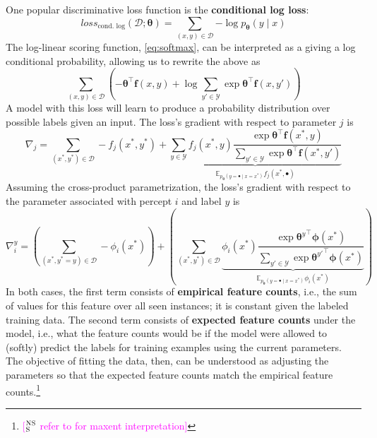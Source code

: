 \documentclass[11pt,letterpaper]{article}
\newcommand{\ensuretext}[1]{#1}
\newcommand{\nssmarker}{\ensuretext{\textcolor{magenta}{\ensuremath{^{\textsc{NS}}_{\textsc{S}}}}}}
\newcommand{\arkcomment}[3]{\ensuretext{\textcolor{#3}{[#1 #2]}}}
\newcommand{\nss}[1]{\arkcomment{\nssmarker}{#1}{magenta}}
\begin{document}
One popular discriminative loss function is the \textbf{conditional log loss}:
\begin{equation}\label{eq:logloss}
\textit{loss}_\text{cond. log}(\mathcal{D}; \boldsymbol{\theta}) = \sum_{(x,y)\in\mathcal{D}}{-\log{p_{\boldsymbol{\theta}}(y \mid x)}}
\end{equation}
The log-linear scoring function, \cref{eq:softmax}, can be interpreted as a giving a log conditional probability, 
allowing us to rewrite the above as 
\begin{equation}
\sum_{(x,y)\in\mathcal{D}}{\left(-\boldsymbol{\theta}^\top\mathbf{f}(x,y)+\log{\sum_{y'\in\mathcal{Y}}{\exp{\boldsymbol{\theta}^\top\mathbf{f}(x,y')}}}\right)}
\end{equation}
A model with this loss will learn to produce a probability distribution over possible labels given an input.
The loss's gradient with respect to parameter $j$ is
\begin{equation}\label{eq:loggrad}
\nabla_j = \sum_{(x^*,y^*)\in\mathcal{D}}-f_j(x^*,y^*)+\underbrace{\sum_{y\in\mathcal{Y}} f_j(x^*,y)\frac{\exp{\boldsymbol{\theta}^{\top}\mathbf{f}(x^*,y)}}{\sum_{y'\in\mathcal{Y}}{\exp{\boldsymbol{\theta}^{\top}\mathbf{f}(x^*,y')}}}}_{\mathbb{E}_{p_{\boldsymbol{\theta}}(y = \bullet \mid x=x^*)} f_j(x^*,\bullet)}
\end{equation}
Assuming the cross-product parametrization, 
the loss's gradient with respect to the parameter associated with percept $i$ and label $y$ is
\begin{equation}\label{eq:logperceptgrad}
\nabla^y_i = \left(\sum_{(x^*,y^*=y)\in\mathcal{D}}-\phi_i(x^*)\right)+\left(\sum_{(x^*,y^*)\in\mathcal{D}}{\underbrace{\phi_i(x^*)\frac{\exp{{\boldsymbol{\theta}^y}^{\top}\boldsymbol{\phi}(x^*)}}{\sum_{y'\in\mathcal{Y}}{\exp{{\boldsymbol{\theta}^{y'}}^{\top}\boldsymbol{\phi}(x^*)}}}}_{\mathbb{E}_{p_{\boldsymbol{\theta}}(y = \bullet \mid x=x^*)} \phi_i(x^*)}}\right)
\end{equation}
In both cases, the first term consists of \textbf{empirical feature counts}, 
i.e., the sum of values for this feature over all seen instances; 
it is constant given the labeled training data. The second term consists of \textbf{expected feature counts} 
under the model, i.e., what the feature counts would be if the model were allowed to (softly) predict the labels 
for training examples using the current parameters. The objective of fitting the data, then, 
can be understood as adjusting the parameters so that the expected feature counts match the empirical feature counts.\footnote{\nss{refer to \citep{smith} for maxent interpretation}}
\end{document}
